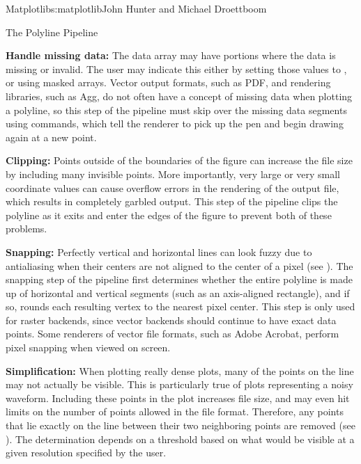 \begin{aosachapter}{Matplotlib}{s:matplotlib}{John Hunter and Michael Droettboom}
\begin{aosasect1}{The Polyline Pipeline}
\begin{aosaenumerate}
\item \textbf{Handle missing data:} The data array may have portions
  where the data is missing or invalid.  The user may indicate this
  either by setting those values to , or using  masked arrays.
  Vector output formats, such as PDF, and rendering libraries, such as
  Agg, do not often have a concept of missing data when plotting a
  polyline, so this step of the pipeline must skip over the missing
  data segments using  commands, which tell the renderer
  to pick up the pen and begin drawing again at a new point.

\item \textbf{Clipping:} Points outside of the boundaries of the
  figure can increase the file size by including many invisible
  points.  More importantly, very large or very small coordinate
  values can cause overflow errors in the rendering of the output
  file, which results in completely garbled output.  This step of the
  pipeline clips the polyline as it exits and enter the edges of the
  figure to prevent both of these problems.

\item \textbf{Snapping:} Perfectly vertical and horizontal lines can
  look fuzzy due to antialiasing when their centers are not aligned to
  the center of a pixel (see
  ).  The snapping step of
  the pipeline first determines whether the entire polyline is made up
  of horizontal and vertical segments (such as an axis-aligned
  rectangle), and if so, rounds each resulting vertex to the nearest
  pixel center.  This step is only used for raster backends, since
  vector backends should continue to have exact data points.  Some
  renderers of vector file formats, such as Adobe Acrobat, perform
  pixel snapping when viewed on screen.

\item \textbf{Simplification:} When plotting really dense plots, many
  of the points on the line may not actually be visible.  This is
  particularly true of plots representing a noisy waveform.  Including
  these points in the plot increases file size, and may even hit
  limits on the number of points allowed in the file format.
  Therefore, any points that lie exactly on the line between their two
  neighboring points are removed (see
  ).  The determination
  depends on a threshold based on what would be visible at a given
  resolution specified by the user.


\end{aosaenumerate}
\end{aosasect1}
\end{aosachapter}
